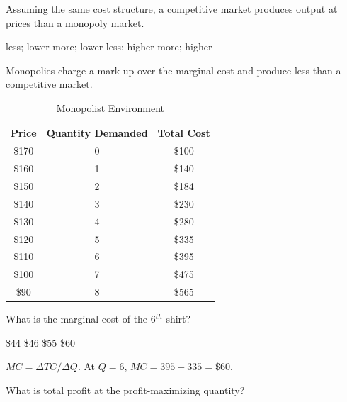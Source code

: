 \documentclass[addpoints,11pt]{exam}
\theoremstyle{definition}
\newcommand{\blank}[0]{\underline{\hspace{3cm}}}
\begin{document}
\begin{questions}

			\question Assuming the same cost structure, a competitive market produces \blank output at \blank prices than a monopoly market.
			
			\begin{choices}
				\choice less; lower
				\CorrectChoice more; lower
				\choice less; higher
				\choice more; higher
			\end{choices}
			
			\begin{solution}
				Monopolies charge a mark-up over the marginal cost and produce less than a competitive market.
			\end{solution}


		

		\begin{table}[h!]
			\caption{Monopolist Environment}
			\label{tab3}
			\centering
			\begin{tabular}{  c|c|c}    
				Price & Quantity Demanded & Total Cost \\    
				\hline
				\$170 & 0 & \$100 \\
				\$160 & 1 & \$140 \\
				\$150 & 2 & \$184 \\
				\$140 & 3 & \$230 \\
				\$130 & 4 & \$280 \\
				\$120 & 5 & \$335 \\
				\$110 & 6 & \$395 \\
				\$100 & 7 & \$475 \\ 
				\$90 & 8 & \$565 \\
			\end{tabular}
		\end{table}

			
			\question \label{blah3} What is the marginal cost of the 6$^{th}$ shirt?
			
			\begin{choices}
				\choice \$44
				\choice  \$46
				\choice  \$55
				\CorrectChoice \$60
			\end{choices}
			
			\begin{solution}
				$MC = \Delta TC/ \Delta Q$. At $Q=6$, $MC = 395 - 335 = \$60.$
			\end{solution}
			

			\question \label{blah4} What is total profit at the profit-maximizing quantity?
			

\end{questions}
\end{document}
